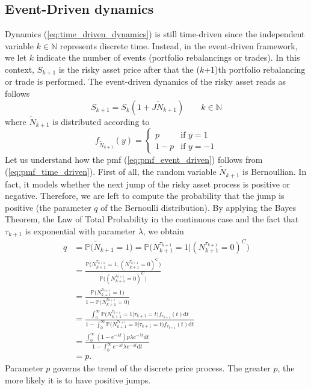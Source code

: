 \subsection{Event-Driven dynamics}
Dynamics (\ref{eq:time_driven_dynamics}) is still time-driven since the independent variable $k \in \mathbb{N}$ represents discrete time. Instead, in the event-driven framework, we let $k$ indicate the number of events (portfolio rebalancings or trades). In this context, $S_{k+1}$ is the risky asset price after that the ($k$+1)th portfolio rebalancing or trade is performed. The event-driven dynamics of the risky asset reads as follows
\begin{equation}\label{eq:event_driven_dynamics}
S_{k+1} = S_{k}(1+J \widetilde{N}_{k+1}) \qquad k \in \mathbb{N}
\end{equation}
where $\widetilde{N}_{k+1}$ is distributed according to 
\begin{equation}\label{eq:pmf_event_driven}
f_{\widetilde{N}_{k+1}}(y)  = 
\begin{cases}
p & \text{if } y = 1 \\
1-p & \text{if } y = -1
\end{cases}
\end{equation}
Let us understand how the pmf (\ref{eq:pmf_event_driven}) follows from (\ref{eq:pmf_time_driven}). First of all, the random variable $\widetilde{N}_{k+1}$ is Bernoullian. In fact, it models whether the next jump of the risky asset process is positive or negative. Therefore, we are left to compute the probability that the jump is positive (the parameter $q$ of the Bernoulli distribution). By applying the Bayes Theorem, the Law of Total Probability in the continuous case and the fact that $\tau_{k+1}$ is exponential with parameter $\lambda$, we obtain
\begin{align*}
q &= \mathbb{P}\big(\widetilde{N}_{k+1} = 1\big) = \mathbb{P}\big(N_{k+1}^{\tau_{k+1}}=1\lvert(N_{k+1}^{\tau_{k+1}}=0)^C\big)\\[1.5ex]
& = \frac{\mathbb{P}\big(N_{k+1}^{\tau_{k+1}}=1,(N_{k+1}^{\tau_{k+1}}=0)^C\big)}{\mathbb{P}\big((N_{k+1}^{\tau_{k+1}}=0)^C\big)}\\[1ex]
&=\frac{\mathbb{P}\big(N_{k+1}^{\tau_{k+1}}=1\big)}{1-\mathbb{P}\big(N_{k+1}^{\tau_{k+1}}=0\big)}\\[1.5ex]
& = \frac{\int_{0}^{\infty}\mathbb{P}\big(N_{k+1}^{\tau_{k+1}} = 1\lvert\tau_{k+1}=t\big)f_{\tau_{k+1}}(t)\mathrm{d}t}{1-\int_{0}^{\infty}\mathbb{P}\big(N_{k+1}^{\tau_{k+1}} = 0\lvert\tau_{k+1}=t\big)f_{\tau_{k+1}}(t)\mathrm{d}t}\\[1.5ex]
& = \frac{\int_{0}^{\infty}(1-e^{-\lambda t})p\lambda e^{-\lambda t} \mathrm{d}t  }{1-\int_{0}^{\infty}e^{-\lambda t}\lambda e^{-\lambda t}\mathrm{d}t } \\[1.5ex]
& = p.
\end{align*}
Parameter $p$ governs the trend of the discrete price process. The greater $p$, the more likely it is to have positive jumps.

